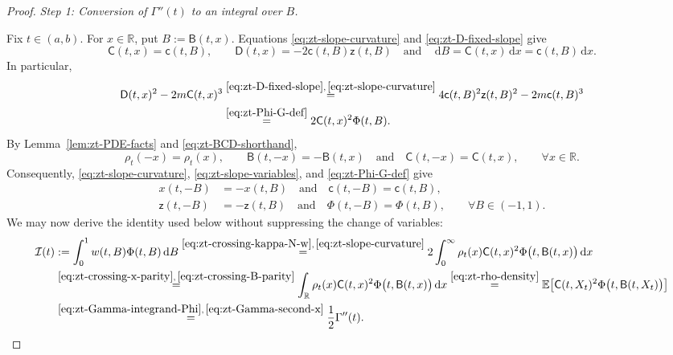 \documentclass[10pt]{amsart}
\theoremstyle{definition}
\theoremstyle{remark}
\numberwithin{equation}{section}
\newcommand{\R}{\mathbb R}
\newcommand{\E}{\mathbb E}
\newcommand{\1}{\mathbf 1}
\newcommand{\cI}{\mathcal I}
\newcommand{\dd}{\,\mathrm d}
\newcommand{\stackref}[2]{\stackrel{#2}{#1}}
\begin{document}
\begin{proof}
\smallskip
\noindent\emph{Step 1: Conversion of $\Gamma''(t)$ to an integral over $B$.}

Fix $t\in(a,b)$. For $x\in\R$, put $B:=\mathsf B(t,x)$. Equations \eqref{eq:zt-slope-curvature} and \eqref{eq:zt-D-fixed-slope} give
\begin{equation*}
 \mathsf C(t,x)=\mathsf c(t,B),\qquad
 \mathsf D(t,x)=-2\mathsf c(t,B)\mathsf z(t,B)
 \quad\text{and}\quad
 \dd B=\mathsf C(t,x)\dd x=\mathsf c(t,B)\dd x.
\end{equation*}
In particular,
\begin{align}
 \mathsf D(t,x)^2-2m\mathsf C(t,x)^3
 &\stackref{=}{\eqref{eq:zt-D-fixed-slope},\,\eqref{eq:zt-slope-curvature}}
 4\mathsf c(t,B)^2\mathsf z(t,B)^2-2m\mathsf c(t,B)^3 \notag\\
 &\stackref{=}{\eqref{eq:zt-Phi-G-def}}
 2\mathsf C(t,x)^2\Phi(t,B).
 \label{eq:zt-Gamma-integrand-Phi}
\end{align}
By Lemma~\ref{lem:zt-PDE-facts} and \eqref{eq:zt-BCD-shorthand},
\begin{equation}
 \rho_t(-x)=\rho_t(x),\qquad \mathsf B(t,-x)=-\mathsf B(t,x)
 \quad\text{and}\quad \mathsf C(t,-x)=\mathsf C(t,x),
 \qquad \forall x\in\R.
 \label{eq:zt-crossing-x-parity}
\end{equation}
Consequently, \eqref{eq:zt-slope-curvature}, \eqref{eq:zt-slope-variables}, and \eqref{eq:zt-Phi-G-def} give
\begin{equation}
\begin{aligned}
 x(t,-B)&=-x(t,B)\quad\text{and}\quad \mathsf c(t,-B)=\mathsf c(t,B),\\
 \mathsf z(t,-B)&=-\mathsf z(t,B)\quad\text{and}\quad \Phi(t,-B)=\Phi(t,B),
 \qquad \forall B\in(-1,1).
\end{aligned}
\label{eq:zt-crossing-B-parity}
\end{equation}
We may now derive the identity used below without suppressing the change of variables:
\begin{align}
 \cI(t)&:=\int_0^1w(t,B)\Phi(t,B)\dd B \stackref{=}{\eqref{eq:zt-crossing-kappa-N-w},\,\eqref{eq:zt-slope-curvature}}
 2\int_0^\infty\rho_t(x)\mathsf C(t,x)^2\Phi\bigl(t,\mathsf B(t,x)\bigr)\dd x \notag\\
 &\stackref{=}{\eqref{eq:zt-crossing-x-parity},\,\eqref{eq:zt-crossing-B-parity}}
 \int_\R\rho_t(x)\mathsf C(t,x)^2\Phi\bigl(t,\mathsf B(t,x)\bigr)\dd x \stackref{=}{\eqref{eq:zt-rho-density}}
 \E\!\left[\mathsf C(t,X_t)^2\Phi\bigl(t,\mathsf B(t,X_t)\bigr)\right] \notag\\
 &\stackref{=}{\eqref{eq:zt-Gamma-integrand-Phi},\,\eqref{eq:zt-Gamma-second-x}}
 \frac12\Gamma''(t).
 \label{eq:zt-Gamma-second-I}
\end{align}


\end{proof}
\end{document}
